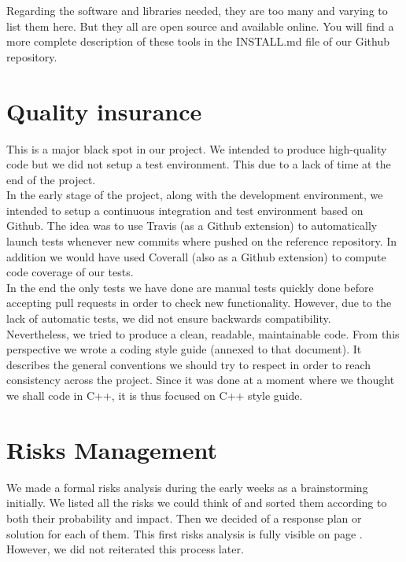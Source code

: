 \noindent
Regarding the software and libraries needed,
they are too many and varying to list them here.
But they all are open source and available online.
You will find a more complete description of these
tools in the INSTALL.md file of our Github repository.

\section{Quality insurance}
This is a major black spot in our project.
We intended to produce high-quality code but we did not
setup a test environment. This due to a lack of time
at the end of the project.\\

\noindent
In the early stage of the project, along with the development environment,
we intended to setup a continuous integration and test environment based
on Github.
The idea was to use Travis (as a Github extension) to automatically launch
tests whenever new commits where pushed on the reference repository.
In addition we would have used Coverall (also as a Github extension)
to compute code coverage of our tests.\\

\noindent
In the end the only tests we have done are manual tests
quickly done before accepting pull requests in order to check
new functionality.
However, due to the lack of automatic tests, we did not ensure
backwards compatibility.\\

\noindent
Nevertheless, we tried to produce a clean, readable, maintainable code.
From this perspective we wrote a coding style guide (annexed to that document).
It describes the general conventions we should try to respect in order to
reach consistency across the project.
Since it was done at a moment where we thought we shall code in C++,
it is thus focused on C++ style guide.

\section{Risks Management}
We made a formal risks analysis during the early weeks as a
brainstorming initially. We listed all the risks we could think of and
sorted them according to both their probability and impact. Then we
decided of a response plan or solution for each of them. This first
risks analysis is fully visible on page \pageref{fig:risks}. However,
we did not reiterated this process later. 

